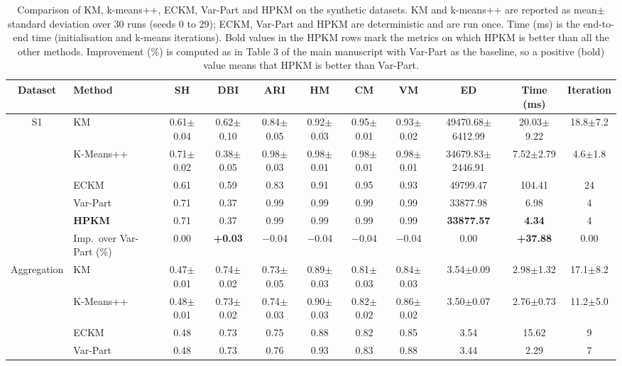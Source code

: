 \begin{table}[p]
\centering
\caption{Comparison of KM, k-means++, ECKM, Var-Part and HPKM on the synthetic datasets. KM and k-means++ are reported as mean$\pm$standard deviation over 30 runs (seeds 0 to 29); ECKM, Var-Part and HPKM are deterministic and are run once. Time (ms) is the end-to-end time (initialisation and k-means iterations). Bold values in the HPKM rows mark the metrics on which HPKM is better than all the other methods. Improvement (\%) is computed as in Table 3 of the main manuscript with Var-Part as the baseline, so a positive (bold) value means that HPKM is better than Var-Part.}
\label{tab:S1}
\scriptsize
\setlength{\tabcolsep}{3pt}
\begin{adjustbox}{max width=\textwidth, max totalheight=0.85\textheight}
\begin{tabular}{|c|l|ccccccccc|}
\hline
Dataset & Method & SH & DBI & ARI & HM & CM & VM & ED & Time (ms) & Iteration \\
\hline
S1 & KM & 0.61$\pm$0.04 & 0.62$\pm$0.10 & 0.84$\pm$0.05 & 0.92$\pm$0.03 & 0.95$\pm$0.01 & 0.93$\pm$0.02 & 49470.68$\pm$6412.99 & 20.03$\pm$9.22 & 18.8$\pm$7.2 \\
 & K-Means++ & 0.71$\pm$0.02 & 0.38$\pm$0.05 & 0.98$\pm$0.03 & 0.98$\pm$0.01 & 0.98$\pm$0.01 & 0.98$\pm$0.01 & 34679.83$\pm$2446.91 & 7.52$\pm$2.79 & 4.6$\pm$1.8 \\
 & ECKM & 0.61 & 0.59 & 0.83 & 0.91 & 0.95 & 0.93 & 49799.47 & 104.41 & 24 \\
 & Var-Part & 0.71 & 0.37 & 0.99 & 0.99 & 0.99 & 0.99 & 33877.98 & 6.98 & 4 \\
 & \textbf{HPKM} & 0.71 & 0.37 & 0.99 & 0.99 & 0.99 & 0.99 & \textbf{33877.57} & \textbf{4.34} & 4 \\
& Imp.\ over Var-Part (\%) & 0.00 & \textbf{+0.03} & $-$0.04 & $-$0.04 & $-$0.04 & $-$0.04 & 0.00 & \textbf{+37.88} & 0.00 \\
\hline
Aggregation & KM & 0.47$\pm$0.01 & 0.74$\pm$0.02 & 0.73$\pm$0.05 & 0.89$\pm$0.03 & 0.81$\pm$0.03 & 0.84$\pm$0.03 & 3.54$\pm$0.09 & 2.98$\pm$1.32 & 17.1$\pm$8.2 \\
 & K-Means++ & 0.48$\pm$0.01 & 0.73$\pm$0.02 & 0.74$\pm$0.03 & 0.90$\pm$0.03 & 0.82$\pm$0.02 & 0.86$\pm$0.02 & 3.50$\pm$0.07 & 2.76$\pm$0.73 & 11.2$\pm$5.0 \\
 & ECKM & 0.48 & 0.73 & 0.75 & 0.88 & 0.82 & 0.85 & 3.54 & 15.62 & 9 \\
 & Var-Part & 0.48 & 0.73 & 0.76 & 0.93 & 0.83 & 0.88 & 3.44 & 2.29 & 7 \\

\end{tabular}
\end{adjustbox}
\end{table}
